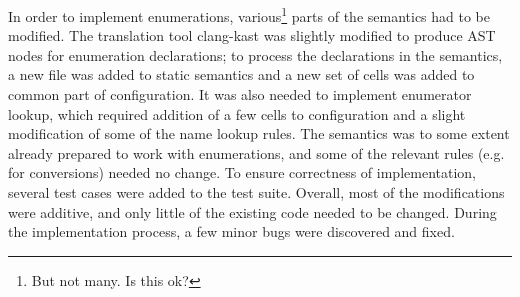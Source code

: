 \documentclass{fithesis3}
\begin{document}










In order to implement enumerations, various\footnote{But not many. Is this ok?} parts of the semantics had to be modified. The translation tool clang-kast was slightly modified to produce AST nodes for enumeration declarations; to process the declarations in the semantics, a new file was added to static semantics and a new set of cells was added to common part of configuration. It was also needed to implement enumerator lookup, which required addition of a few cells to configuration and a slight modification of some of the name lookup rules. The semantics was to some extent already prepared to work with enumerations, and some of the relevant rules (e.g. for conversions) needed no change. To ensure correctness of implementation, several test cases were added to the test suite. Overall, most of the modifications were additive, and only little of the existing code needed to be changed. During the implementation process, a few minor bugs were discovered and fixed. 
\end{document}
